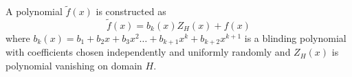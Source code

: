 \begin{definition}
    A polynomial $\widetilde{f}(x)$ is constructed as
    $$\widetilde{f}(x) = b_k(x)Z_H(x) + f(x)$$
    where $b_k(x) = b_1 + b_2x + b_3x^2 \ldots + b_{k+1}x^{k} + b_{k+2}x^{k+1}$ is a blinding polynomial with coefficients chosen independently and uniformly randomly and $Z_H(x)$ is polynomial vanishing on domain $H$.
\end{definition}



    
    



    
